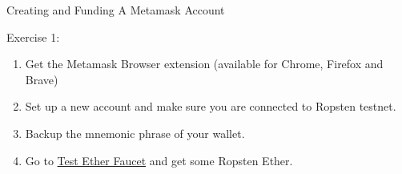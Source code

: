 \documentclass[handout]{beamer}
\begin{document}
\begin{frame}{Creating and Funding A Metamask Account}

	\begin{exercise}{Exercise 1:}
		\begin{enumerate}
			\item Get the Metamask Browser extension (available for Chrome, Firefox and Brave)
			\item Set up a new account and make sure you are connected to Ropsten testnet.
			\item Backup the mnemonic phrase of your wallet.
			\item Go to \link \href{https://faucet.metamask.io/}{Test Ether Faucet} and get some Ropsten Ether.
		\end{enumerate}
	\end{exercise}	
\end{frame}
\end{document}
